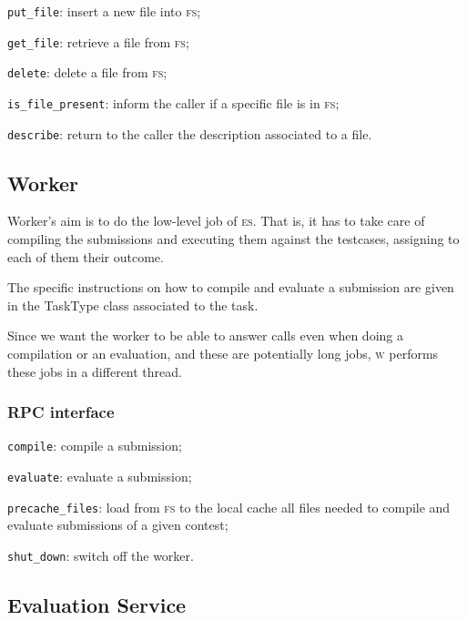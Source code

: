\documentclass[a4paper,8pt]{amsart}
\newcommand{\FS}{\textsc{fs}}
\newcommand{\ES}{\textsc{es}}
\newcommand{\WS}{\textsc{w}}
\newenvironment{squishlist}{%
  \begin{list}{\textbullet}%
    { \setlength{\itemsep}{0pt}%
      \setlength{\parsep}{3pt}%
      \setlength{\topsep}{3pt}%
      \setlength{\partopsep}{0pt}%
      \setlength{\leftmargin}{1.5em}%
      \setlength{\labelwidth}{1em}%
      \setlength{\labelsep}{0.5em} }%
}{\end{list}}
\newcommand{\id}[1]{\texttt{#1}}
\begin{document}
\begin{multicols}{2}
  \begin{squishlist}
  \item \id{put\_file}: insert a new file into \FS{};
  \item \id{get\_file}: retrieve a file from \FS{};
  \item \id{delete}: delete a file from \FS{};
  \item \id{is\_file\_present}: inform the caller if a specific file is
    in \FS{};
  \item \id{describe}: return to the caller the description associated
    to a file.
  \end{squishlist}

  \subsection{Worker}

  Worker's aim is to do the low-level job of \ES{}. That is, it
  has to take care of compiling the submissions and executing them
  against the testcases, assigning to each of them their outcome.

  The specific instructions on how to compile and evaluate a
  submission are given in the TaskType class associated to the task.

  Since we want the worker to be able to answer calls even when doing
  a compilation or an evaluation, and these are potentially long jobs,
  \WS{} performs these jobs in a different thread.

  \subsubsection{RPC interface}

  \begin{squishlist}
  \item \id{compile}: compile a submission;
  \item \id{evaluate}: evaluate a submission;
  \item \id{precache\_files}: load from \FS{} to the local cache all
    files needed to compile and evaluate submissions of a given
    contest;
  \item \id{shut\_down}: switch off the worker.
  \end{squishlist}

  \subsection{Evaluation Service}


\end{multicols}
\end{document}
